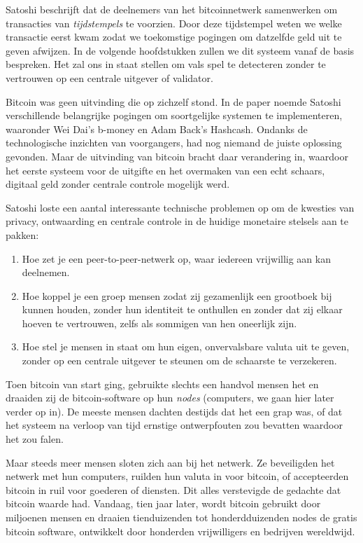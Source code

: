 \documentclass[smalldemyvopaper,11pt,twoside,onecolumn,openright,extrafontsizes]{memoir}
\begin{document}
Satoshi beschrijft dat de deelnemers van het bitcoinnetwerk samenwerken om transacties van \textit{tijdstempels} te voorzien. Door deze tijdstempel weten we welke transactie eerst kwam zodat we toekomstige pogingen om datzelfde geld uit te geven afwijzen. In de volgende hoofdstukken zullen we dit systeem vanaf de basis bespreken. Het zal ons in staat stellen om vals spel te detecteren zonder te vertrouwen op een centrale uitgever of validator.


Bitcoin was geen uitvinding die op zichzelf stond. In de paper noemde Satoshi verschillende belangrijke pogingen om soortgelijke systemen te implementeren, waaronder Wei Dai's b-money en Adam Back's Hashcash. Ondanks de technologische inzichten van voorgangers, had nog niemand de juiste oplossing gevonden. Maar de uitvinding van bitcoin bracht daar verandering in, waardoor het eerste systeem voor de uitgifte en het overmaken van een echt schaars, digitaal geld zonder centrale controle mogelijk werd.

Satoshi loste een aantal interessante technische problemen op om de kwesties van privacy, ontwaarding en centrale controle in de huidige monetaire stelsels aan te pakken:

\begin{enumerate}
    \item Hoe zet je een peer-to-peer-netwerk op, waar iedereen vrijwillig aan kan deelnemen.
    \item Hoe koppel je een groep mensen zodat zij gezamenlijk een grootboek bij kunnen houden, zonder hun identiteit te onthullen en zonder dat zij elkaar hoeven te vertrouwen, zelfs als sommigen van hen oneerlijk zijn.
    \item Hoe stel je mensen in staat om hun eigen, onvervalsbare valuta uit te geven, zonder op een centrale uitgever te steunen om de schaarste te verzekeren.
\end{enumerate}

Toen bitcoin van start ging, gebruikte slechts een handvol mensen het en draaiden zij de bitcoin-software op hun \textit{nodes} (computers, we gaan hier later verder op in). De meeste mensen dachten destijds dat het een grap was, of dat het systeem na verloop van tijd ernstige ontwerpfouten zou bevatten waardoor het zou falen.

Maar steeds meer mensen sloten zich aan bij het netwerk. Ze beveiligden het netwerk met hun computers, ruilden hun valuta in voor bitcoin, of accepteerden bitcoin in ruil voor goederen of diensten. Dit alles verstevigde de gedachte dat bitcoin waarde had. Vandaag, tien jaar later, wordt bitcoin gebruikt door miljoenen mensen en draaien tienduizenden tot honderdduizenden nodes de gratis bitcoin software, ontwikkelt door honderden vrijwilligers en bedrijven wereldwijd.
\end{document}
